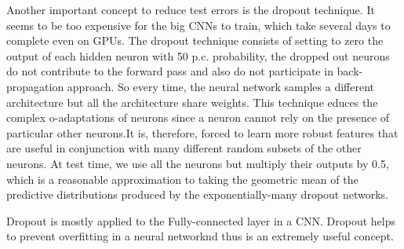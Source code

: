Another important concept to reduce test errors is the dropout technique. It seems to be too expensive for the big CNNs to train, which take several days to complete even on GPUs. The dropout technique consists of setting to zero the output of each hidden neuron with 50 p.c. probability, the dropped out neurons do not contribute to the forward pass and also do not participate in back-propagation approach. So every time, the neural network samples a different architecture but all the architecture share weights. This technique educes the complex o-adaptations of neurons since a neuron cannot rely on the presence of particular other neurons.It is, therefore, forced to learn more robust features that are useful in conjunction with many different random subsets of the other neurons. At test time, we use all the neurons but multiply their outputs by 0.5, which is a reasonable approximation to taking the geometric mean of the predictive distributions produced by the exponentially-many dropout networks.

Dropout is mostly applied to the Fully-connected layer in a CNN. Dropout helps to prevent overfitting in a neural networknd thus is an extremely useful concept.




